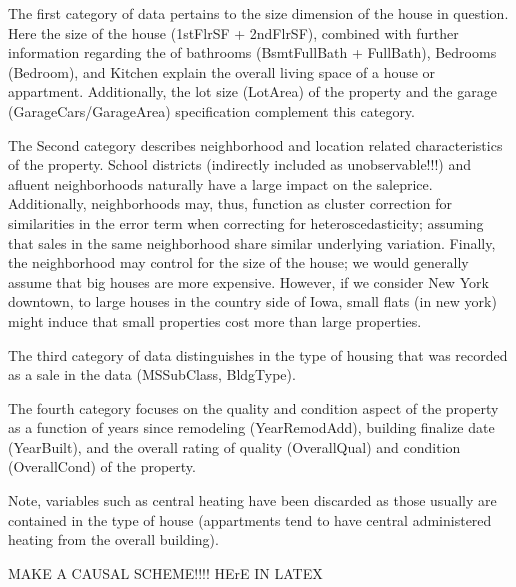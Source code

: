 \documentclass{article}
\begin{document}








\indent The first category of data pertains to the size dimension of the house in
question. Here the size of the house (1stFlrSF + 2ndFlrSF), combined with
further information regarding the of bathrooms (BsmtFullBath + FullBath),
Bedrooms (Bedroom), and Kitchen explain the overall living space of a house
or appartment. Additionally, the lot size (LotArea) of the property and the
garage (GarageCars/GarageArea) specification complement this category.

The Second category describes neighborhood and location related characteristics of the property. School districts (indirectly included as unobservable!!!) and afluent neighborhoods naturally have a large impact on the saleprice. Additionally, neighborhoods may, thus, function as cluster correction for similarities in the error term when correcting for heteroscedasticity; assuming that sales in the same neighborhood share similar underlying variation. Finally, the neighborhood may control for the size of the house; we would generally assume that big houses are more expensive. However, if we consider New York downtown, to large houses in the country side of Iowa, small flats (in new york) might induce that small properties cost more than large properties. 

The third category of data distinguishes in the type of housing that was recorded as a sale in the data (MSSubClass, BldgType). 

The fourth category focuses on the quality and condition aspect of the property as a function of years since remodeling (YearRemodAdd), building finalize date (YearBuilt), and the overall rating of quality (OverallQual) and condition (OverallCond) of the property.





Note, variables such as central heating have been discarded as those usually are contained in the type of house (appartments tend to have central administered heating from the overall building).

MAKE A CAUSAL SCHEME!!!! HErE IN LATEX
\end{document}
